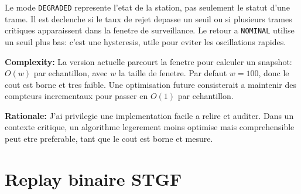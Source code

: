 \documentclass[10pt,a4paper]{article}
\newcommand{\complexity}[1]{\textbf{Complexity:} #1}
\newcommand{\rationale}[1]{\textbf{Rationale:} #1}
\begin{document}
Le mode \texttt{DEGRADED} represente l'etat de la station, pas seulement le statut d'une trame. Il est declenche si le taux de rejet depasse un seuil ou si plusieurs trames critiques apparaissent dans la fenetre de surveillance. Le retour a \texttt{NOMINAL} utilise un seuil plus bas: c'est une hysteresis, utile pour eviter les oscillations rapides.

\complexity{La version actuelle parcourt la fenetre pour calculer un snapshot: $O(w)$ par echantillon, avec $w$ la taille de fenetre. Par defaut $w=100$, donc le cout est borne et tres faible. Une optimisation future consisterait a maintenir des compteurs incrementaux pour passer en $O(1)$ par echantillon.}

\rationale{J'ai privilegie une implementation facile a relire et auditer. Dans un contexte critique, un algorithme legerement moins optimise mais comprehensible peut etre preferable, tant que le cout est borne et mesure.}

\section{Replay binaire STGF}
\end{document}
